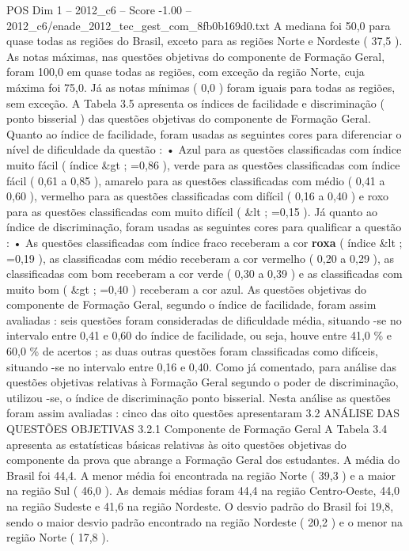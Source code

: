 \begin{textsample}{POS Dim 1 – 2012\_c6 – Score -1.00 – 2012\_c6/enade\_2012\_tec\_gest\_com\_8fb0b169d0.txt}
A mediana foi 50,0 para quase todas as regiões do Brasil, exceto para as regiões Norte e Nordeste ( 37,5 ).
As notas máximas, nas questões objetivas do componente de Formação Geral, foram 100,0 em quase todas as regiões, com exceção da região Norte, cuja máxima foi 75,0.
Já as notas mínimas ( 0,0 ) foram iguais para todas as regiões, sem exceção.
A Tabela 3.5 apresenta os índices de facilidade e discriminação ( ponto bisserial ) das questões objetivas do componente de Formação Geral.
Quanto ao índice de facilidade, foram usadas as seguintes cores para diferenciar o nível de dificuldade da questão : • Azul para as questões classificadas com índice muito fácil ( índice \&gt ; =0,86 ), verde para as questões classificadas com índice fácil ( 0,61 a 0,85 ), amarelo para as questões classificadas com médio ( 0,41 a 0,60 ), vermelho para as questões classificadas com difícil ( 0,16 a 0,40 ) e roxo para as questões classificadas com muito difícil ( \&lt ; =0,15 ).
Já quanto ao índice de discriminação, foram usadas as seguintes cores para qualificar a questão : • As questões classificadas com índice fraco receberam a cor \textbf{roxa} ( índice \&lt ; =0,19 ), as classificadas com médio receberam a cor vermelho ( 0,20 a 0,29 ), as classificadas com bom receberam a cor verde ( 0,30 a 0,39 ) e as classificadas com muito bom ( \&gt ; =0,40 ) receberam a cor azul.
As questões objetivas do componente de Formação Geral, segundo o índice de facilidade, foram assim avaliadas : seis questões foram consideradas de dificuldade média, situando -se no intervalo entre 0,41 e 0,60 do índice de facilidade, ou seja, houve entre 41,0 \% e 60,0 \% de acertos ; as duas outras questões foram classificadas como difíceis, situando -se no intervalo entre 0,16 e 0,40.
Como já comentado, para análise das questões objetivas relativas à Formação Geral segundo o poder de discriminação, utilizou -se, o índice de discriminação ponto bisserial.
Nesta análise as questões foram assim avaliadas : cinco das oito questões apresentaram 3.2 ANÁLISE DAS QUESTÕES OBJETIVAS 3.2.1 Componente de Formação Geral A Tabela 3.4 apresenta as estatísticas básicas relativas às oito questões objetivas do componente da prova que abrange a Formação Geral dos estudantes.
A média do Brasil foi 44,4.
A menor média foi encontrada na região Norte ( 39,3 ) e a maior na região Sul ( 46,0 ).
As demais médias foram 44,4 na região Centro-Oeste, 44,0 na região Sudeste e 41,6 na região Nordeste.
O desvio padrão do Brasil foi 19,8, sendo o maior desvio padrão encontrado na região Nordeste ( 20,2 ) e o menor na região Norte ( 17,8 ).

\end{textsample}
